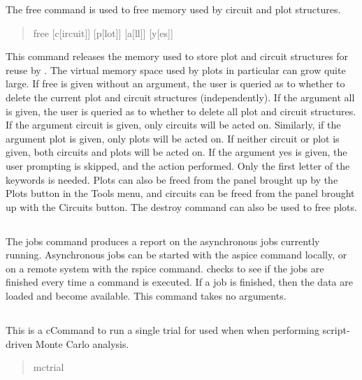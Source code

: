 The {\cb free} command is used to free memory used by circuit and plot
structures.
\begin{quote}\vt
free [c[ircuit]] [p[lot]] [a[ll]] [y[es]]
\end{quote}
This command releases the memory used to store plot and circuit
structures for reuse by {\WRspice}.  The virtual memory space used by
plots in particular can grow quite large.  If {\cb free} is given
without an argument, the user is queried as to whether to delete the
current plot and circuit structures (independently).  If the argument
{\vt all} is given, the user is queried as to whether to delete all
plot and circuit structures.  If the argument {\vt circuit} is given,
only circuits will be acted on.  Similarly, if the argument {\vt plot}
is given, only plots will be acted on.  If neither {\vt circuit} or
{\vt plot} is given, both circuits and plots will be acted on.  If the
argument {\vt yes} is given, the user prompting is skipped, and the
action performed.  Only the first letter of the keywords is needed. 
Plots can also be freed from the panel brought up by the {\cb Plots}
button in the {\cb Tools} menu, and circuits can be freed from the
panel brought up with the {\cb Circuits} button.  The {\cb destroy}
command can also be used to free plots.

\subsection{}


The {\cb jobs} command produces a report on the asynchronous
{\WRspice} jobs currently running.  Asynchronous jobs can be started
with the {\cb aspice} command locally, or on a remote system with the
{\cb rspice} command.  {\WRspice} checks to see if the jobs are
finished every time a command is executed.  If a job is finished, then
the data are loaded and become available.  This command takes no
arguments.

\subsection{}


This is a cCommand to run a single trial for used when when performing
script-driven Monte Carlo analysis.
\begin{quote}\vt
mctrial
\end{quote}

